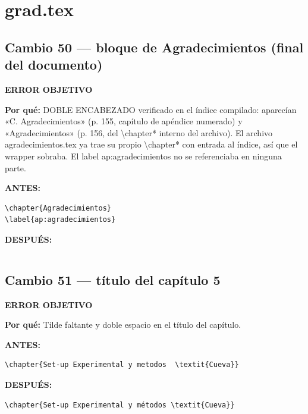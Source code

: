 \documentclass[11pt,a4paper]{article}
\begin{document}
\section*{grad.tex}
\subsection*{Cambio 50 --- bloque de Agradecimientos (final del documento)}
\colorbox{okbg}{\textbf{\footnotesize ERROR OBJETIVO}}

\textbf{Por qué:} DOBLE ENCABEZADO verificado en el índice compilado: aparecían «C. Agradecimientos» (p. 155, capítulo de apéndice numerado) y «Agradecimientos» (p. 156, del \textbackslash{}chapter* interno del archivo). El archivo agradecimientos.tex ya trae su propio \textbackslash{}chapter* con entrada al índice, así que el wrapper sobraba. El label ap:agradecimientos no se referenciaba en ninguna parte.

\textcolor{antesline}{\textbf{ANTES:}}
\begin{Verbatim}[breaklines=true, breakanywhere=true, fontsize=\small, frame=leftline, rulecolor=\color{antesline}, framerule=1.2pt]
\chapter{Agradecimientos}
\label{ap:agradecimientos}

\end{Verbatim}
\textcolor{despline}{\textbf{DESPUÉS:}}
\begin{Verbatim}[breaklines=true, breakanywhere=true, fontsize=\small, frame=leftline, rulecolor=\color{despline}, framerule=1.2pt]

\end{Verbatim}

\subsection*{Cambio 51 --- título del capítulo 5}
\colorbox{okbg}{\textbf{\footnotesize ERROR OBJETIVO}}

\textbf{Por qué:} Tilde faltante y doble espacio en el título del capítulo.

\textcolor{antesline}{\textbf{ANTES:}}
\begin{Verbatim}[breaklines=true, breakanywhere=true, fontsize=\small, frame=leftline, rulecolor=\color{antesline}, framerule=1.2pt]
\chapter{Set-up Experimental y metodos  \textit{Cueva}}
\end{Verbatim}
\textcolor{despline}{\textbf{DESPUÉS:}}
\begin{Verbatim}[breaklines=true, breakanywhere=true, fontsize=\small, frame=leftline, rulecolor=\color{despline}, framerule=1.2pt]
\chapter{Set-up Experimental y métodos \textit{Cueva}}
\end{Verbatim}
\end{document}
